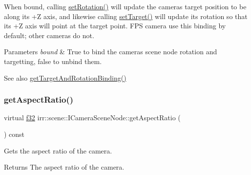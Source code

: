 When bound, calling \hyperlink{classirr_1_1scene_1_1ICameraSceneNode_af95d5f50c192f212e11f3f050e92a470}{set\+Rotation()} will update the camera\textquotesingle{}s target position to be along its +Z axis, and likewise calling \hyperlink{classirr_1_1scene_1_1ICameraSceneNode_a7280b07fd7915c64350db5a132b4ba07}{set\+Target()} will update its rotation so that its +Z axis will point at the target point. F\+PS camera use this binding by default; other cameras do not. 
\begin{DoxyParams}{Parameters}
{\em bound} & True to bind the camera\textquotesingle{}s scene node rotation and targetting, false to unbind them. \\
\hline
\end{DoxyParams}
\begin{DoxySeeAlso}{See also}
\hyperlink{classirr_1_1scene_1_1ICameraSceneNode_a343be24b2c43db7580127229db2dec6a}{get\+Target\+And\+Rotation\+Binding()} 
\end{DoxySeeAlso}
\mbox{\label{classirr_1_1scene_1_1ICameraSceneNode_aed7af13bc5a076d61a10a1998f71742e}} 
\subsubsection{\texorpdfstring{get\+Aspect\+Ratio()}{getAspectRatio()}\hspace{0.1cm}{\footnotesize\ttfamily [1/2]}}
{\footnotesize\ttfamily virtual \hyperlink{namespaceirr_a0277be98d67dc26ff93b1a6a1d086b07}{f32} irr\+::scene\+::\+I\+Camera\+Scene\+Node\+::get\+Aspect\+Ratio (\begin{DoxyParamCaption}{ }\end{DoxyParamCaption}) const\hspace{0.3cm}{\ttfamily [pure virtual]}}



Gets the aspect ratio of the camera. 

\begin{DoxyReturn}{Returns}
The aspect ratio of the camera. 
\end{DoxyReturn}
\mbox{\label{classirr_1_1scene_1_1ICameraSceneNode_aed7af13bc5a076d61a10a1998f71742e}} 
